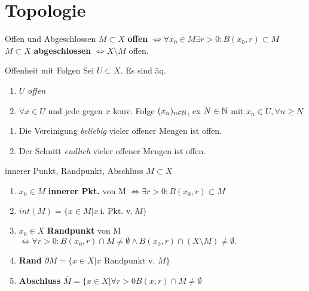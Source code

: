 \section{Topologie}

\begin{definition}{Offen und Abgeschlossen}
  $M \subset X$ \textbf{offen} $\Leftrightarrow \forall x_0 \in M
  \exists r>0: B(x_0,r) \subset M$\\
  $M \subset X$ \textbf{abgeschlossen} $\Leftrightarrow X\setminus M$ offen.
\end{definition}

\begin{satz}{Offenheit mit Folgen}
  Sei \(U\subset X\). Es sind äq.
  \begin{enumerate}[label=(\roman*)]
    \item \(U\) \textit{offen}
    \item \(\forall x\in U\) und jede gegen \(x\) konv.
      Folge \((x_n)_{n\in \mathbb{N}}\), ex \(N\in\mathbb{N}\) mit \(x_n \in U,
      \forall n\geq N\)
  \end{enumerate}
\end{satz}

\begin{lemma}
  \begin{enumerate}[label = (\arabic*)]
    \item Die Vereinigung \textit{beliebig} vieler offener Mengen ist offen.
    \item Der Schnitt \textit{endlich} vieler offener Mengen ist offen.
  \end{enumerate}
\end{lemma}

\begin{definition}{innerer Punkt, Randpunkt, Abschluss}
  $M \subset X$
  \begin{enumerate}[label = (\arabic*)]
    \item $x_0 \in M$ \textbf{innerer Pkt.} von M
      $\Leftrightarrow \exists r>0: B(x_0,r) \subset M$
    \item $int(M) = \{x \in M|x\ \text{i. Pkt. v.}\ M\}$
    \item $x_0 \in X$ \textbf{Randpunkt} von M $\Leftrightarrow
      \forall r>0: B(x_0,r) \cap M \neq \emptyset \wedge B(x_0,r)
      \cap (X\setminus M) \neq \emptyset.$
    \item \textbf{Rand} $\partial M = \{x\in X| x \text{ Randpunkt v. } M\}$
    \item \textbf{Abschluss} $\overline{M} = \{x \in X|\forall r>0 B(x,r)\cap
      M \neq \emptyset$
  \end{enumerate}
\end{definition}

